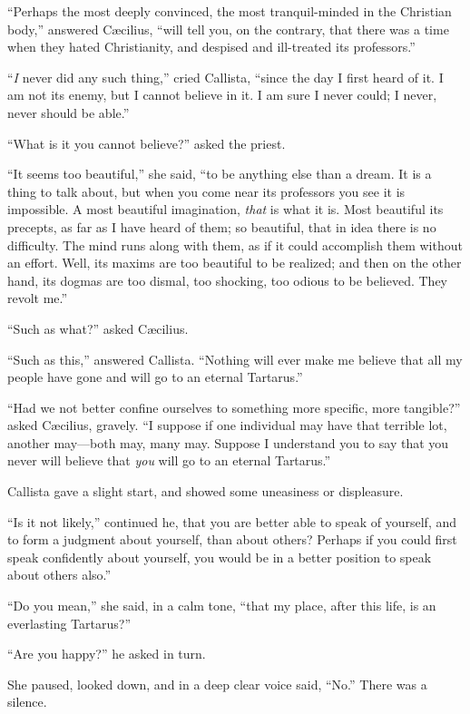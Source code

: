 ``Perhaps the most deeply convinced, the most tranquil-minded
in the Christian body,'' answered Cæcilius, ``will tell you,
on the contrary, that there was a time when they hated Christianity,
and despised and ill-treated its professors.''

``\emph{I} never did any such thing,'' cried Callista,
``since the day I first heard of it. I am not its enemy, but I
cannot believe in it. I am sure I never could; I never, never should
be able.''

``What is it you cannot believe?'' asked the priest.

``It seems too beautiful,'' she said, ``to be anything
else than a dream. It is a thing to talk about, but when you come near
its professors you see it is impossible. A most beautiful imagination,
\emph{that} is what it is. Most beautiful its precepts, as far as I
have heard of them; so beautiful, that in idea there is no difficulty.
The mind runs along with them, as if it could accomplish them without
an effort. Well, its maxims are too beautiful to be realized; and then
on the other hand, its dogmas are too dismal, too shocking, too odious
to be believed. They revolt me.''

``Such as what?'' asked Cæcilius.

``Such as this,'' answered Callista. ``Nothing will
ever make me believe that all my people have gone and will go to an
eternal Tartarus.''

``Had we not better confine ourselves to something more
specific, more tangible?'' asked Cæcilius, gravely. ``I
suppose if one individual may have that terrible lot, another
may—both may, many may. Suppose I understand you to say that you
never will believe that \emph{you} will go to an eternal Tartarus.''

Callista gave a slight start, and showed some uneasiness or
displeasure.

``Is it not likely,'' continued he, that you are better
able to speak of yourself, and to form a judgment about yourself, than
about others? Perhaps if you could first speak confidently about
yourself, you would be in a better position to speak about others
also.''

``Do you mean,'' she said, in a calm tone, ``that my
place, after this life, is an everlasting Tartarus?''

``Are you happy?'' he asked in turn.

She paused, looked down, and in a deep clear voice said,
``No.'' There was a silence.

